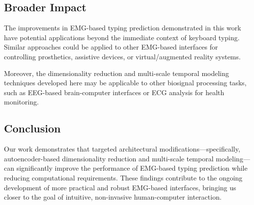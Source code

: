 \subsection{Broader Impact}

The improvements in EMG-based typing prediction demonstrated in this work have potential applications beyond the immediate context of keyboard typing. Similar approaches could be applied to other EMG-based interfaces for controlling prosthetics, assistive devices, or virtual/augmented reality systems.

Moreover, the dimensionality reduction and multi-scale temporal modeling techniques developed here may be applicable to other biosignal processing tasks, such as EEG-based brain-computer interfaces or ECG analysis for health monitoring.

\subsection{Conclusion}

Our work demonstrates that targeted architectural modifications—specifically, autoencoder-based dimensionality reduction and multi-scale temporal modeling—can significantly improve the performance of EMG-based typing prediction while reducing computational requirements. These findings contribute to the ongoing development of more practical and robust EMG-based interfaces, bringing us closer to the goal of intuitive, non-invasive human-computer interaction.